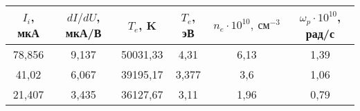 \begin{table}[h!]
    \centering
    \begin{tabular}{|c|c|c|c|c|c|}
    \hline
    $I_i$, мкА & $dI/dU$, мкА/В & $T_e$, K  & $T_e$, эВ  & $n_e \cdot 10^{10}, ~ \text{см}^{-3}$ & $\omega_p \cdot 10^10$, рад/с \\ \hline
    78,856     & 9,137          & 50031,33  & 4,31       & 6,13                & 1,39                          \\ \hline
    41,02      & 6,067          & 39195,17  & 3,377      & 3,6                 & 1,06                          \\ \hline
    21,407     & 3,435          & 36127,67  & 3,11       & 1,96                & 0,79                          \\ \hline
    \end{tabular}
\end{table}
